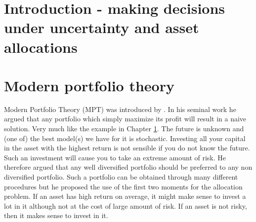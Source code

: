 \documentclass[oneside]{book}\usepackage{knitr}
\begin{document}
%  


\tableofcontents
\chapter[Introduction]{Introduction - making decisions under uncertainty and asset allocations}\label{ch:intro}

\chapter[Modern portfolio theory]{Modern portfolio theory}\label{ch:MPT}



Modern Portfolio Theory (MPT) was introduced by \cite{markowitz1959portfolio}. 
In his seminal work he argued that any portfolio which simply maximize its profit will result in a naive solution.
Very much like the example in Chapter \ref{ch:intro}. 
The future is unknown and (one of) the best model(s) we have for it is stochastic.
Investing all your capital in the asset with the highest return is not sensible if you do not know the future.
Such an investment will cause you to take an extreme amount of risk. 
He therefore argued that any well diversified portfolio should be preferred to any non diversified portfolio. 
Such a portfolio can be obtained through many different procedures but he proposed the use of the first two moments for the allocation problem.
If an asset has high return on average, it might make sense to invest a lot in it although not at the cost of large amount of risk. If an asset is not risky, then it makes sense to invest in it.
\end{document}
